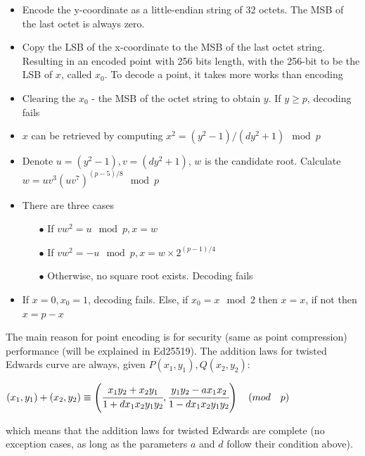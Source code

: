 \begin{itemize}
  \item Encode the y-coordinate as a little-endian string of 32 octets. The MSB of the last octet is always zero.
  \item Copy the LSB of the x-coordinate to the MSB of the last octet string.
        Resulting in an encoded point with 256 bits length, with the 256-bit to be the LSB of $x$, called $x_0$. To decode a point, it takes more works than encoding
  \item Clearing the $x_0$ - the MSB of the octet string to obtain $y$. If $y \geq p$, decoding fails
  \item $x$ can be retrieved by computing $x^2 = (y^2 - 1)/(dy^2 + 1) \mod p$
  \item Denote $u = (y^2-1), v = (dy^2 + 1)$, $w$ is the candidate root. Calculate $w = uv^3(uv^7)^{(p-5)/8} \mod p$
  \item There are three cases

        \begin{itemize}
          \item[$\bullet$] If $vw^2 = u \mod p, x = w$
          \item[$\bullet$] If $vw^2 = -u \mod p, x = w \times 2^{(p-1)/4}$
          \item[$\bullet$] Otherwise, no square root exists. Decoding fails
        \end{itemize}

  \item If $x = 0,x_0 = 1$, decoding fails. Else, if $x_0 = x \mod 2$ then $x = x$, if not then $x = p - x$
\end{itemize}

The main reason for point encoding is for security (same as point compression) performance (will be explained in Ed25519). The addition laws for twisted Edwards curve are always, given $P(x_1, y_1), Q(x_2, y_2)$:

\hspace{0.25cm}
\begin{center}
  $(x_1, y_1) + (x_2, y_2) \equiv \left(\cfrac{x_1y_2 + x_2y_1}{1 + dx_1x_2y_1y_2}, \cfrac{y_1y_2 - ax_1x_2}{1 - dx_1x_2y_1y_2}\right) \quad (mod \quad p) $
\end{center}
\hspace{0.25cm}

which means that the addition laws for twisted Edwards are complete (no exception cases, as long as the parameters $a$ and $d$ follow their condition above).

